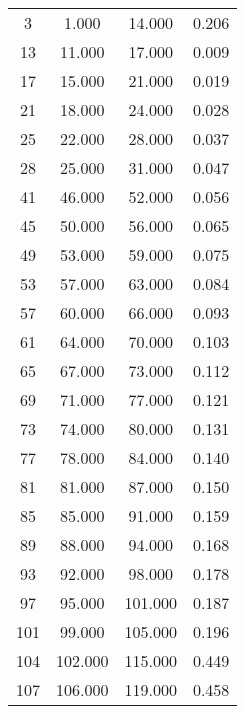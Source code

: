 % 
\begin{tabular}{cccc}
  \hline
  \hline
3 & 1.000 & 14.000 & 0.206 \\ 
  13 & 11.000 & 17.000 & 0.009 \\ 
  17 & 15.000 & 21.000 & 0.019 \\ 
  21 & 18.000 & 24.000 & 0.028 \\ 
  25 & 22.000 & 28.000 & 0.037 \\ 
  28 & 25.000 & 31.000 & 0.047 \\ 
  41 & 46.000 & 52.000 & 0.056 \\ 
  45 & 50.000 & 56.000 & 0.065 \\ 
  49 & 53.000 & 59.000 & 0.075 \\ 
  53 & 57.000 & 63.000 & 0.084 \\ 
  57 & 60.000 & 66.000 & 0.093 \\ 
  61 & 64.000 & 70.000 & 0.103 \\ 
  65 & 67.000 & 73.000 & 0.112 \\ 
  69 & 71.000 & 77.000 & 0.121 \\ 
  73 & 74.000 & 80.000 & 0.131 \\ 
  77 & 78.000 & 84.000 & 0.140 \\ 
  81 & 81.000 & 87.000 & 0.150 \\ 
  85 & 85.000 & 91.000 & 0.159 \\ 
  89 & 88.000 & 94.000 & 0.168 \\ 
  93 & 92.000 & 98.000 & 0.178 \\ 
  97 & 95.000 & 101.000 & 0.187 \\ 
  101 & 99.000 & 105.000 & 0.196 \\ 
  104 & 102.000 & 115.000 & 0.449 \\ 
  107 & 106.000 & 119.000 & 0.458 \\ 
   \hline
\end{tabular}
